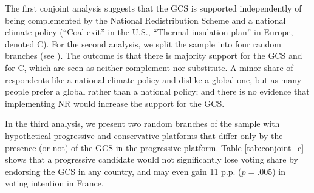 The first conjoint analysis suggests that the GCS is supported independently of being complemented by the National Redistribution Scheme and a national climate policy (``Coal exit'' in the U.S., ``Thermal insulation plan'' in Europe, denoted C).
For the second analysis, we split the sample into four random branches (see ). 
The outcome is that there is majority support for the GCS and for C, which are seen as neither complement nor substitute. A minor share of respondents like a national climate policy and dislike a global one, but as many people prefer a global rather than a national policy; and there is no evidence that implementing NR would increase the support for the GCS.


In the third analysis, we present two random branches of the sample with hypothetical progressive and conservative platforms that differ only by the presence (or not) of the GCS in the progressive platform. Table \ref{tab:conjoint_c} shows that a progressive candidate would not significantly lose voting share by endorsing the GCS in any country, and may even gain 11 p.p. ($p = .005$) in voting intention in France. %


